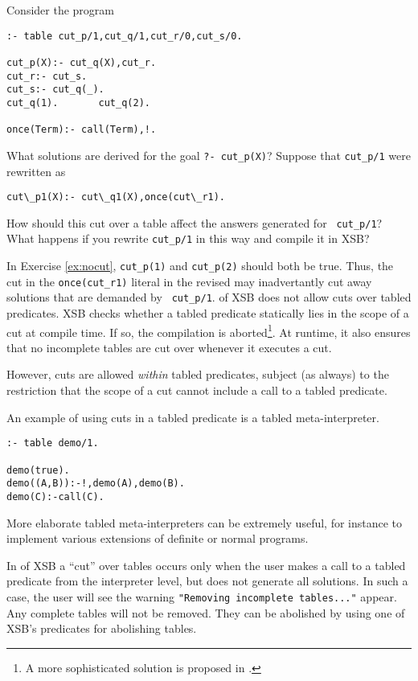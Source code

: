 \begin{exercise} \label{ex:nocut}
Consider the program
\begin{verbatim}
:- table cut_p/1,cut_q/1,cut_r/0,cut_s/0.

cut_p(X):- cut_q(X),cut_r.
cut_r:- cut_s.
cut_s:- cut_q(_).
cut_q(1).       cut_q(2).

once(Term):- call(Term),!.
\end{verbatim}
What solutions are derived for the goal {\tt ?- cut\_p(X)}?  Suppose that
{\tt cut\_p/1} were rewritten as 
\begin{verbatim}
cut\_p1(X):- cut\_q1(X),once(cut\_r1).
\end{verbatim}

How should this cut over a table affect the answers generated for {\tt
cut\_p/1}?  What happens if you rewrite {\tt cut\_p/1} in this way and
compile it in XSB?
\end{exercise}

In Exercise \ref{ex:nocut}, {\tt cut\_p(1)} and {\tt cut\_p(2)} should
both be true.  Thus, the cut in the {\tt once(cut\_r1)} literal in the
revised may inadvertantly cut away solutions that are demanded by {\tt
cut\_p/1}.  \version{} of XSB does not allow cuts over tabled
predicates.  XSB checks whether a tabled predicate statically lies in
the scope of a cut at compile time.  If so, the compilation is
aborted\footnote{A more sophisticated solution is proposed in
\cite{Swif99b}.}. At runtime, it also ensures that no incomplete
tables are cut over whenever it executes a cut.

However, cuts are allowed {\em within} tabled predicates, subject (as
always) to the restriction that the scope of a cut cannot include a
call to a tabled predicate.

\begin{example}
An example of using cuts in a tabled predicate is a tabled
meta-interpreter.
\begin{verbatim}
:- table demo/1.

demo(true).
demo((A,B)):-!,demo(A),demo(B).
demo(C):-call(C).
\end{verbatim}
More elaborate tabled meta-interpreters can be extremely useful, for
instance to implement various extensions of definite or normal
programs.
\end{example}

In \version{} of XSB a ``cut'' over tables occurs only when the user
makes a call to a tabled predicate from the interpreter level, but
does not generate all solutions.  In such a case, the user will see
the warning {\tt "Removing incomplete tables..."} appear.  Any
complete tables will not be removed.  They can be abolished by using
one of XSB's predicates for abolishing tables.

